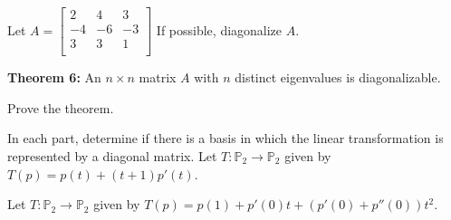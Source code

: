 \newpage



\begin{enumerate}

\Problem Let $A=\begin{bmatrix} 
2 & 4 & 3\\
-4 & -6 & -3\\
3 & 3 & 1\\
\end{bmatrix}$ If possible, diagonalize $A$.


\vfill
\vfill

{\bf Theorem 6:} An $n \times n$ matrix $A$ with $n$ distinct eigenvalues is diagonalizable.

\Problem Prove the theorem.

\vfill

\newpage

\Problem In each part, determine if there is a basis in which the linear transformation is represented by a diagonal matrix.
\Part Let $T: \mathbb{P}_2 \to \mathbb{P}_2$ given by $T(p)= p(t) +(t+1)p'(t)$.

\vfill

\Part Let $T: \mathbb{P}_2 \to \mathbb{P}_2$ given by $T(p) = p(1)+p'(0) t + (p'(0)+p''(0))t^2.$

\vfill




\end{enumerate}

